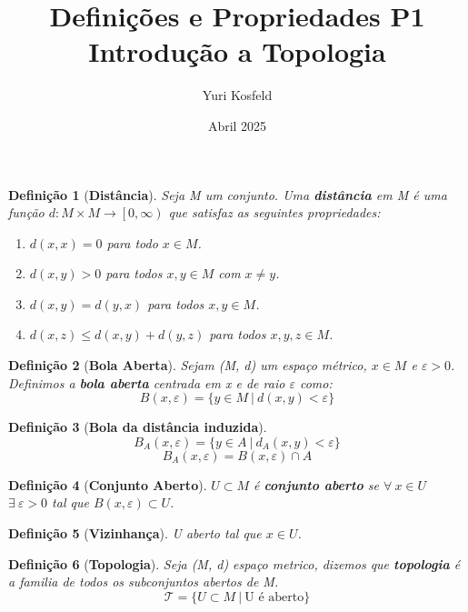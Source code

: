 \documentclass{article}
\title{Definições e Propriedades P1 \\ \large Introdução a Topologia}
\author{Yuri Kosfeld}
\date{Abril 2025}
\newtheorem*{definition}{Definição}
\begin{document}
\maketitle

\begin{definition}[\textbf{Distância}]
    Seja M um conjunto. Uma \textbf{distância} em M é uma função $d: M \times M \rightarrow \left[0, \infty \right)$
    que satisfaz as seguintes propriedades: 
    \begin{enumerate}
        \item $d(x,x) = 0$ para todo $x \in M$.
        \item $d(x,y) > 0$ para todos $x, y \in M$ com $x \neq y$.
        \item $d(x, y) = d(y, x)$ para todos $x,y \in M$.
        \item $d(x,z) \leq d(x, y) + d(y, z)$ para todos $x, y, z \in M$.
    \end{enumerate}
\end{definition}

\begin{definition}[\textbf{Bola Aberta}]
    Sejam (M, d) um espaço métrico, $x\in M$ e $\varepsilon > 0$. Definimos a \textbf{bola aberta}
    centrada em x e de raio $\varepsilon$ como:
    \[ B(x, \varepsilon) = \{ y \in M \: | \: d(x, y) < \varepsilon \} \]
\end{definition}

\begin{definition}[\textbf{Bola da distância induzida}]
    \[B_A(x, \varepsilon) = \{y \in A \: | \: d_A (x,y) < \varepsilon \}\]
    \[B_A(x, \varepsilon) = B(x, \varepsilon) \cap A\]
\end{definition}

\begin{definition}[\textbf{Conjunto Aberto}]
    $U \subset M$ é \textbf{conjunto aberto} se $\forall \: x \in U$ $\exists \: \varepsilon > 0$ tal que $B(x, \varepsilon) \subset U$.
\end{definition}

\begin{definition}[\textbf{Vizinhança}]
    U aberto tal que $x \in U$.
\end{definition}

\begin{definition}[\textbf{Topologia}]
    Seja (M, d) espaço metrico, dizemos que \textbf{topologia} é a familia de todos os subconjuntos abertos de M.
    \[ \mathcal{T} = \{ U \subset M \: | \: \text{U é aberto}\} \]
\end{definition}
\end{document}
